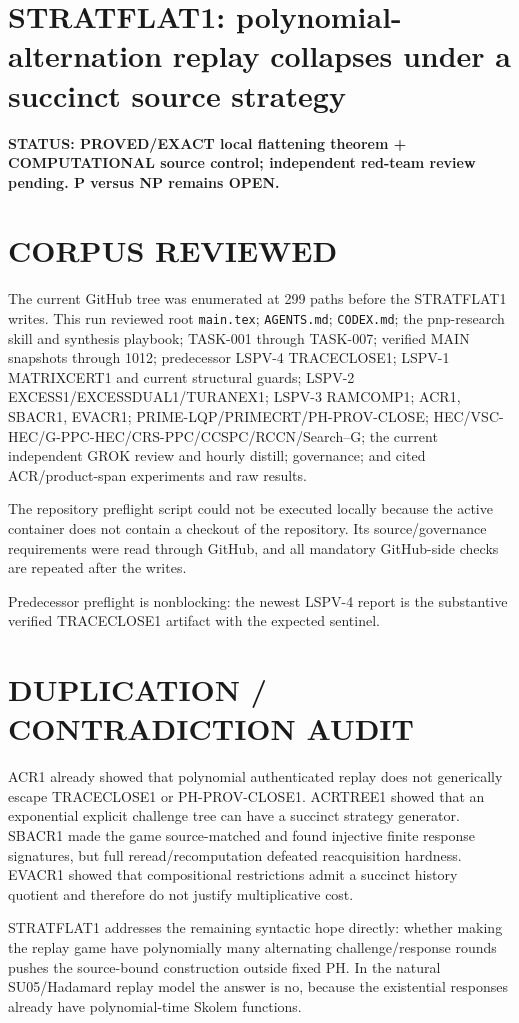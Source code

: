 \documentclass[11pt]{article}
\begin{document}
\section*{STRATFLAT1: polynomial-alternation replay collapses under a succinct source strategy}

\textbf{STATUS: PROVED/EXACT local flattening theorem + COMPUTATIONAL source control; independent red-team review pending. P versus NP remains OPEN.}

\section*{CORPUS REVIEWED}
The current GitHub tree was enumerated at 299 paths before the STRATFLAT1 writes. This run reviewed root \texttt{main.tex}; \texttt{AGENTS.md}; \texttt{CODEX.md}; the pnp-research skill and synthesis playbook; TASK-001 through TASK-007; verified MAIN snapshots through 1012; predecessor LSPV-4 TRACECLOSE1; LSPV-1 MATRIXCERT1 and current structural guards; LSPV-2 EXCESS1/EXCESSDUAL1/TURANEX1; LSPV-3 RAMCOMP1; ACR1, SBACR1, EVACR1; PRIME-LQP/PRIMECRT/PH-PROV-CLOSE; HEC/VSC-HEC/G-PPC-HEC/CRS-PPC/CCSPC/RCCN/Search--G; the current independent GROK review and hourly distill; governance; and cited ACR/product-span experiments and raw results.

The repository preflight script could not be executed locally because the active container does not contain a checkout of the repository. Its source/governance requirements were read through GitHub, and all mandatory GitHub-side checks are repeated after the writes.

Predecessor preflight is nonblocking: the newest LSPV-4 report is the substantive verified TRACECLOSE1 artifact with the expected sentinel.

\section*{DUPLICATION / CONTRADICTION AUDIT}
ACR1 already showed that polynomial authenticated replay does not generically escape TRACECLOSE1 or PH-PROV-CLOSE1. ACRTREE1 showed that an exponential explicit challenge tree can have a succinct strategy generator. SBACR1 made the game source-matched and found injective finite response signatures, but full reread/recomputation defeated reacquisition hardness. EVACR1 showed that compositional restrictions admit a succinct history quotient and therefore do not justify multiplicative cost.

STRATFLAT1 addresses the remaining syntactic hope directly: whether making the replay game have polynomially many alternating challenge/response rounds pushes the source-bound construction outside fixed PH. In the natural SU05/Hadamard replay model the answer is no, because the existential responses already have polynomial-time Skolem functions.
\end{document}
